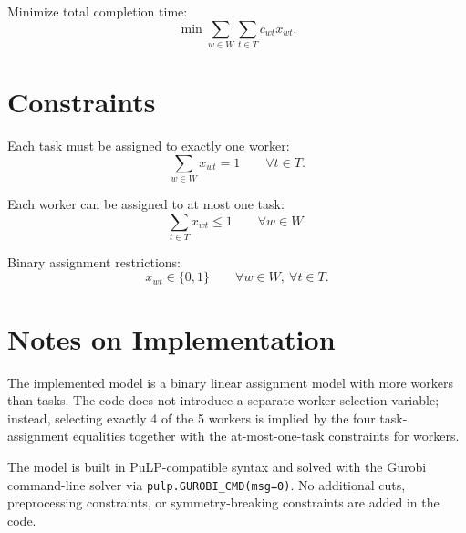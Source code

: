 Minimize total completion time:
\[
\min \sum_{w \in W}\sum_{t \in T} c_{wt} x_{wt}.
\]

\section*{Constraints}

Each task must be assigned to exactly one worker:
\[
\sum_{w \in W} x_{wt} = 1
\qquad \forall t \in T.
\]

Each worker can be assigned to at most one task:
\[
\sum_{t \in T} x_{wt} \le 1
\qquad \forall w \in W.
\]

Binary assignment restrictions:
\[
x_{wt} \in \{0,1\}
\qquad \forall w \in W,\ \forall t \in T.
\]

\section*{Notes on Implementation}

The implemented model is a binary linear assignment model with more workers than tasks. The code does not introduce a separate worker-selection variable; instead, selecting exactly 4 of the 5 workers is implied by the four task-assignment equalities together with the at-most-one-task constraints for workers.

The model is built in PuLP-compatible syntax and solved with the Gurobi command-line solver via \texttt{pulp.GUROBI\_CMD(msg=0)}. No additional cuts, preprocessing constraints, or symmetry-breaking constraints are added in the code.
